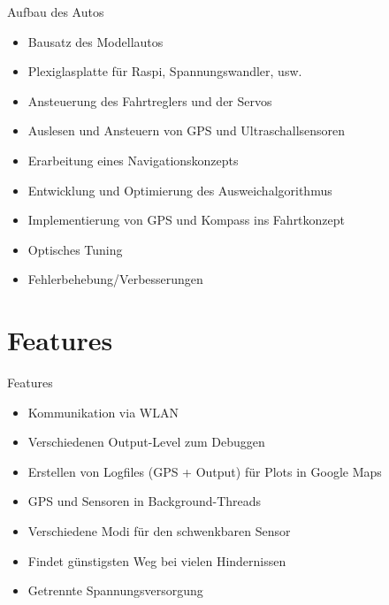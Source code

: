 \begin{frame}{Aufbau des Autos}
\begin{itemize}
\item Bausatz des Modellautos
\item Plexiglasplatte für Raspi, Spannungswandler, usw.
\item Ansteuerung des Fahrtreglers und der Servos
\item Auslesen und Ansteuern von GPS und Ultraschallsensoren
\item Erarbeitung eines Navigationskonzepts
\item Entwicklung und Optimierung des Ausweichalgorithmus
\item Implementierung von GPS und Kompass ins Fahrtkonzept
\item Optisches Tuning
\item Fehlerbehebung/Verbesserungen
\end{itemize}
\end{frame}

\section{Features}
\begin{frame}{Features}
\begin{itemize}
\item Kommunikation via WLAN
\item Verschiedenen Output-Level zum Debuggen
\item Erstellen von Logfiles (GPS + Output) für Plots in Google Maps
\item GPS und Sensoren in Background-Threads 
\item Verschiedene Modi für den schwenkbaren Sensor
\item Findet günstigsten Weg bei vielen Hindernissen
\item Getrennte Spannungsversorgung
\end{itemize}
\end{frame}

